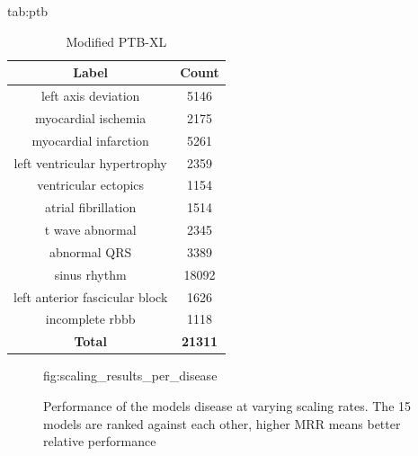 \documentclass[pmlr,twocolumn]{jmlr}%
\begin{document}
\begin{table}[tbp]

\floatconts
  {tab:ptb}%
  {\caption{Modified PTB-XL}}%
  {
    \begin{tabular}{|c|c|}
     \hline
    Label & Count \\
     \hline
        left axis deviation                  &   5146 \\
        myocardial ischemia                  &   2175 \\
        myocardial infarction                &   5261 \\
        left ventricular hypertrophy         &   2359 \\
        ventricular ectopics                 &   1154 \\
        atrial fibrillation                  &   1514 \\
        t wave abnormal                      &   2345 \\
        abnormal QRS                         &   3389 \\
        sinus rhythm                         &  18092 \\
        left anterior fascicular block       &   1626 \\
        incomplete rbbb &   1118 \\
     \hline
    \textbf{Total} & \textbf{21311}\\
    \hline
    \end{tabular}
  }
\end{table}


\begin{figure}[!ht]
\floatconts
  {fig:scaling_results_per_disease}
  {\vspace*{-10mm}\caption{Performance of the models disease at varying scaling rates. The 15 models are ranked against each other, higher MRR means better relative performance}}
  {
  }\vspace{-8mm}
\end{figure}
\end{document}
